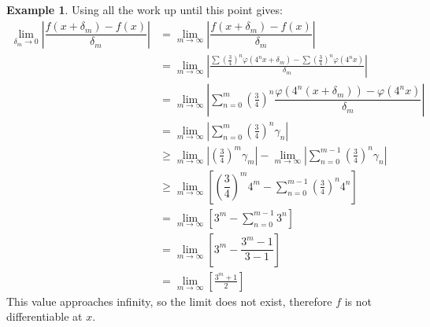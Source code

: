 \documentclass{article}
\theoremstyle{definition}
\newtheorem{example}{Example}[section]
\begin{document}
\begin{example}
		Using all the work up until this point gives:
		\begin{align*}
			\lim\limits_{\delta_m\to 0}\left\lvert \dfrac{f(x + \delta_m)- f(x)}{\delta_m}\right\rvert & = \lim\limits_{m\to \infty}\left\lvert \dfrac{f(x + \delta_m)- f(x)}{\delta_m}\right\rvert \\
			& = \lim\limits_{m\to \infty}\left\lvert \frac{\sum\left(\frac{3}{4}\right)^n\varphi(4^nx + \delta_m) - \sum\left(\frac{3}{4}\right)^n\varphi(4^nx)}{\delta_m}\right\rvert \\& = \lim\limits_{m\to \infty}\left\lvert  \sum_{n=0}^{m}\left(\frac{3}{4}\right)^n\dfrac{\varphi(4^n(x+\delta_m)) - \varphi(4^nx)}{\delta_m}\right\rvert \\ & = \lim\limits_{m\to \infty}\left\lvert  \sum_{n=0}^{m}\left(\frac{3}{4}\right)^n\gamma_n\right\rvert\\ & \ge\lim\limits_{m\to \infty}\left\lvert \left(\frac{3}{4}\right)^m\gamma_m\right\rvert -  \lim\limits_{m\to \infty}\left\lvert \sum_{n=0}^{m-1}\left(\frac{3}{4}\right)^n\gamma_n\right\rvert\\ & \ge \lim\limits_{m\to \infty} \left[\left(\dfrac{3}{4}\right)^m4^m - \sum_{n=0}^{m-1}\left(\frac{3}{4}\right)^n4^n\right]\\ & = \lim\limits_{m\to\infty}\left[3^m - \sum_{n=0}^{m-1}3^n\right] \\& = \lim\limits_{m\to\infty}\left[3^m - \dfrac{3^m-1}{3-1}\right] \\ & = \lim\limits_{m\to\infty}\left[\frac{3^m+1}{2}\right] 
		\end{align*}
		This value approaches infinity, so the limit does not exist, therefore $ f $ is not differentiable at $ x $. 
	\end{example}
	
\end{document}
